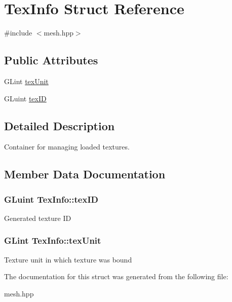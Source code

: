 \hypertarget{structTexInfo}{\section{Tex\-Info Struct Reference}
\label{structTexInfo}
}


{\ttfamily \#include $<$mesh.\-hpp$>$}

\subsection*{Public Attributes}
\begin{DoxyCompactItemize}
\item 
G\-Lint \hyperlink{structTexInfo_aa0ca376877aa6a7d832d6227e595c567}{tex\-Unit}
\item 
G\-Luint \hyperlink{structTexInfo_a519e7ed6c5b6bc974900515d5c4beec6}{tex\-I\-D}
\end{DoxyCompactItemize}


\subsection{Detailed Description}
Container for managing loaded textures. 

\subsection{Member Data Documentation}
\hypertarget{structTexInfo_a519e7ed6c5b6bc974900515d5c4beec6}{
\subsubsection[{tex\-I\-D}]{\setlength{\rightskip}{0pt plus 5cm}G\-Luint Tex\-Info\-::tex\-I\-D}}\label{structTexInfo_a519e7ed6c5b6bc974900515d5c4beec6}
Generated texture I\-D \hypertarget{structTexInfo_aa0ca376877aa6a7d832d6227e595c567}{
\subsubsection[{tex\-Unit}]{\setlength{\rightskip}{0pt plus 5cm}G\-Lint Tex\-Info\-::tex\-Unit}}\label{structTexInfo_aa0ca376877aa6a7d832d6227e595c567}
Texture unit in which texture was bound 

The documentation for this struct was generated from the following file\-:\begin{DoxyCompactItemize}
\item 
mesh.\-hpp\end{DoxyCompactItemize}
